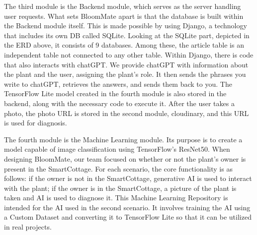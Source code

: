 \documentclass[conference, a4paper]{IEEEtran}
\begin{document}

The third module is the Backend module, which serves as the server handling user requests. What sets BloomMate apart is that the database is built within the Backend module itself. This is made possible by using Django, a technology that includes its own DB called SQLite. Looking at the SQLite part, depicted in the ERD above, it consists of 9 databases. Among these, the article table is an independent table not connected to any other table. Within Django, there is code that also interacts with chatGPT. We provide chatGPT with information about the plant and the user, assigning the plant's role. It then sends the phrases you write to chatGPT, retrieves the answers, and sends them back to you. The TensorFlow Lite model created in the fourth module is also stored in the backend, along with the necessary code to execute it. After the user takes a photo, the photo URL is stored in the second module, cloudinary, and this URL is used for diagnosis.
\newline

The fourth module is the Machine Learning module. Its purpose is to create a model capable of image classification using TensorFlow's ResNet50. When designing BloomMate, our team focused on whether or not the plant's owner is present in the SmartCottage. For each scenario, the core functionality is as follows: if the owner is not in the SmartCottage, generative AI is used to interact with the plant; if the owner is in the SmartCottage, a picture of the plant is taken and AI is used to diagnose it. This Machine Learning Repository is intended for the AI used in the second scenario. It involves training the AI using a Custom Dataset and converting it to TensorFlow Lite so that it can be utilized in real projects.

\newpage
\end{document}
